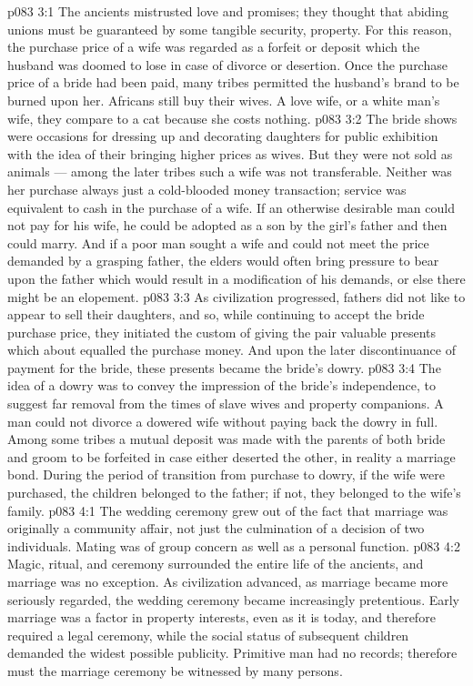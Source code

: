 \vs p083 3:1 The ancients mistrusted love and promises; they thought that abiding unions must be guaranteed by some tangible security, property. For this reason, the purchase price of a wife was regarded as a forfeit or deposit which the husband was doomed to lose in case of divorce or desertion. Once the purchase price of a bride had been paid, many tribes permitted the husband’s brand to be burned upon her. Africans still buy their wives. A love wife, or a white man’s wife, they compare to a cat because she costs nothing.
\vs p083 3:2 The bride shows were occasions for dressing up and decorating daughters for public exhibition with the idea of their bringing higher prices as wives. But they were not sold as animals --- among the later tribes such a wife was not transferable. Neither was her purchase always just a cold\hyp{}blooded money transaction; service was equivalent to cash in the purchase of a wife. If an otherwise desirable man could not pay for his wife, he could be adopted as a son by the girl’s father and then could marry. And if a poor man sought a wife and could not meet the price demanded by a grasping father, the elders would often bring pressure to bear upon the father which would result in a modification of his demands, or else there might be an elopement.
\vs p083 3:3 As civilization progressed, fathers did not like to appear to sell their daughters, and so, while continuing to accept the bride purchase price, they initiated the custom of giving the pair valuable presents which about equalled the purchase money. And upon the later discontinuance of payment for the bride, these presents became the bride’s dowry.
\vs p083 3:4 The idea of a dowry was to convey the impression of the bride’s independence, to suggest far removal from the times of slave wives and property companions. A man could not divorce a dowered wife without paying back the dowry in full. Among some tribes a mutual deposit was made with the parents of both bride and groom to be forfeited in case either deserted the other, in reality a marriage bond. During the period of transition from purchase to dowry, if the wife were purchased, the children belonged to the father; if not, they belonged to the wife’s family.
\vs p083 4:1 The wedding ceremony grew out of the fact that marriage was originally a community affair, not just the culmination of a decision of two individuals. Mating was of group concern as well as a personal function.
\vs p083 4:2 \pc Magic, ritual, and ceremony surrounded the entire life of the ancients, and marriage was no exception. As civilization advanced, as marriage became more seriously regarded, the wedding ceremony became increasingly pretentious. Early marriage was a factor in property interests, even as it is today, and therefore required a legal ceremony, while the social status of subsequent children demanded the widest possible publicity. Primitive man had no records; therefore must the marriage ceremony be witnessed by many persons.
